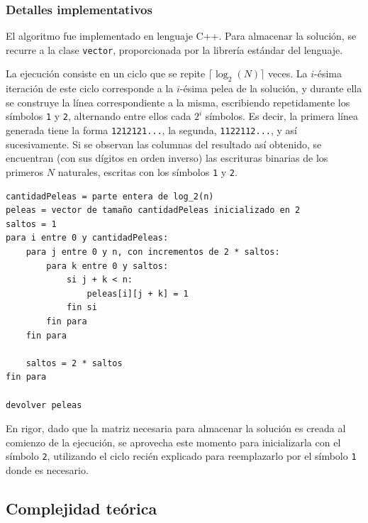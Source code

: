         \subsubsection{Detalles implementativos}
            El algoritmo fue implementado en lenguaje C++. Para almacenar la solución, se recurre a la clase \texttt{vector}, proporcionada por la librería estándar del lenguaje.

            La ejecución consiste en un ciclo que se repite $\lceil \log_2(N) \rceil$ veces. La $i$-ésima iteración de este ciclo corresponde a la $i$-ésima pelea de la solución, y durante ella se construye la línea correspondiente a la misma, escribiendo repetidamente los símbolos \texttt{1} y \texttt{2}, alternando entre ellos cada $2^i$ símbolos. Es decir, la primera línea generada tiene la forma \texttt{1212121...}, la segunda, \texttt{1122112...}, y así sucesivamente. Si se observan las columnas del resultado así obtenido, se encuentran (con sus dígitos en orden inverso) las escrituras binarias de los primeros $N$ naturales, escritas con los símbolos \texttt{1} y \texttt{2}.

        \begin{codesnippet}
        \begin{verbatim}
cantidadPeleas = parte entera de log_2(n)
peleas = vector de tamaño cantidadPeleas inicializado en 2
saltos = 1
para i entre 0 y cantidadPeleas:
    para j entre 0 y n, con incrementos de 2 * saltos:
        para k entre 0 y saltos:
            si j + k < n:
                peleas[i][j + k] = 1
            fin si
        fin para
    fin para

    saltos = 2 * saltos
fin para

devolver peleas
        \end{verbatim}
        \end{codesnippet}

            En rigor, dado que la matriz necesaria para almacenar la solución es creada al comienzo de la ejecución, se aprovecha este momento para inicializarla con el símbolo \texttt{2}, utilizando el ciclo recién explicado para reemplazarlo por el símbolo \texttt{1} donde es necesario.


    \subsection{Complejidad teórica}
         
